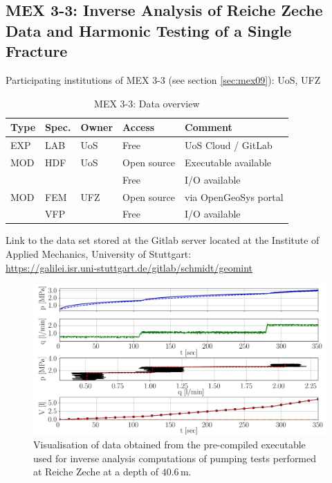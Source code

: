 \subsection{MEX 3-3: Inverse Analysis of Reiche Zeche Data and Harmonic Testing of a Single Fracture}

Participating institutions of MEX 3-3 (see section \ref{sec:mex09}): UoS, UFZ

\begin{table}[ht!]
\caption{MEX 3-3: Data overview}
\label{tab:dms-mex33-overview}
\small
\begin{tabular}{l|l|l|l|L{4.7cm}}
\hline
{}
Type & Spec. & Owner & Access     & Comment                       \\ 
\hline 
EXP  & LAB   & UoS   & Free       & UoS Cloud / GitLab            \\
\hline \hline
MOD  & HDF   & UoS   & Open source &  Executable available        \\
     &       &       & Free       & I/O available                 \\
\hline
MOD  & FEM   & UFZ   & Open source & via OpenGeoSys portal        \\
     & VFP   &       & Free        & I/O available                \\
%
\hline
\end{tabular}
\end{table}
\normalsize

Link to the data set stored at the Gitlab server located at the Institute of Applied Mechanics, University of Stuttgart:\\
\url{https://galilei.isr.uni-stuttgart.de/gitlab/schmidt/geomint}

\begin{figure}[!ht]
\begin{center}
\includegraphics[width=1.0\textwidth]{./figures/data_management_reiche_zeche_40_6.png}
\end{center}
\caption{Visualisation of data obtained from the pre-compiled executable used for inverse analysis computations of pumping tests performed at Reiche Zeche at a depth of $40.6\,$m.}
\label{fig:DataReicheZeche}
\end{figure}

